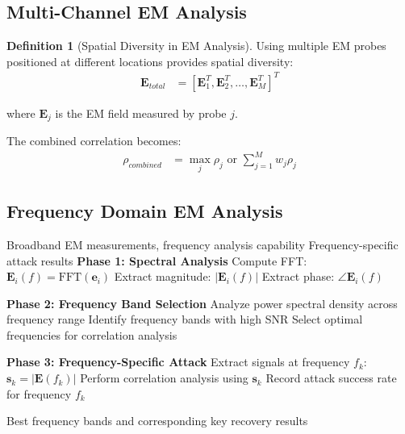 \documentclass[11pt,a4paper]{article}
\theoremstyle{definition}
\newtheorem{definition}{Definition}[section]
\begin{document}
\subsection{Multi-Channel EM Analysis}

\begin{definition}[Spatial Diversity in EM Analysis]
Using multiple EM probes positioned at different locations provides spatial diversity:
\begin{align}
\mathbf{E}_{total} &= [\mathbf{E}_1^T, \mathbf{E}_2^T, \ldots, \mathbf{E}_M^T]^T
\end{align}

where $\mathbf{E}_j$ is the EM field measured by probe $j$.

The combined correlation becomes:
\begin{align}
\rho_{combined} &= \max_j \rho_j \text{ or } \sum_{j=1}^M w_j \rho_j
\end{align}
\end{definition}

\subsection{Frequency Domain EM Analysis}

\begin{algorithm}
\caption{Frequency-Selective EM Analysis}
\begin{algorithmic}[1]
\REQUIRE Broadband EM measurements, frequency analysis capability
\ENSURE Frequency-specific attack results
\STATE \textbf{Phase 1: Spectral Analysis}
    \STATE Compute FFT: $\mathbf{E}_i(f) = \text{FFT}(\mathbf{e}_i)$
    \STATE Extract magnitude: $|\mathbf{E}_i(f)|$
    \STATE Extract phase: $\angle\mathbf{E}_i(f)$
\ENDFOR

\STATE \textbf{Phase 2: Frequency Band Selection}
\STATE Analyze power spectral density across frequency range
\STATE Identify frequency bands with high SNR
\STATE Select optimal frequencies for correlation analysis

\STATE \textbf{Phase 3: Frequency-Specific Attack}
    \STATE Extract signals at frequency $f_k$: $\mathbf{s}_k = |\mathbf{E}(f_k)|$
    \STATE Perform correlation analysis using $\mathbf{s}_k$
    \STATE Record attack success rate for frequency $f_k$
\ENDFOR

\RETURN Best frequency bands and corresponding key recovery results
\end{algorithmic}
\end{algorithm}
\end{document}
